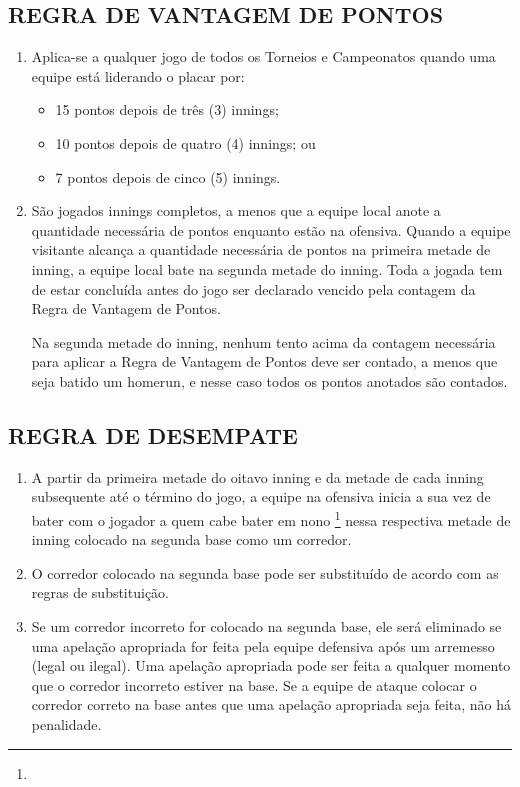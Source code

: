 \subsection{REGRA DE VANTAGEM DE PONTOS}
\begin{enumerate}[label=(\alph*)]
	\item Aplica-se a qualquer jogo de todos os Torneios e Campeonatos quando uma  equipe está liderando o placar por:
	\begin{itemize}
		\item 15 pontos depois de três (3) \glspl{inning};
		\item 10 pontos depois de quatro (4) \glspl{inning}; ou
		\item 7 pontos depois de cinco (5) \glspl{inning}.
	\end{itemize}
	\item São jogados \glspl{inning} completos, a menos que a equipe local anote a  quantidade necessária de pontos enquanto estão na ofensiva. Quando a equipe visitante alcança a quantidade necessária de pontos na primeira metade de \gls{inning}, a equipe local bate na segunda metade do \gls{inning}. Toda a jogada tem de estar concluída antes do jogo ser declarado vencido pela contagem da Regra de Vantagem de Pontos.

	Na segunda metade do \gls{inning}, nenhum tento acima  da contagem necessária para aplicar a Regra de Vantagem de Pontos deve ser contado, a menos que seja batido um \gls{homerun}, e nesse caso todos os pontos anotados são contados.
\end{enumerate}

\subsection{REGRA DE DESEMPATE}
\begin{enumerate}[label=(\alph*)]
	\item A partir da primeira metade do oitavo \gls{inning} e da metade de cada \gls{inning} subsequente até o término do jogo, a equipe na ofensiva inicia a sua vez de bater com o jogador a quem cabe bater em nono \footnote{  } nessa respectiva metade de \gls{inning} colocado na segunda base como um corredor.
	\item  O corredor colocado na segunda base pode ser substituído de acordo com as regras de substituição.
	\item \begin{mdframed}[hidealllines=true,backgroundcolor=blue!20] Se um corredor incorreto for colocado na segunda base, ele será eliminado se uma apelação apropriada for feita pela equipe defensiva após um arremesso (legal ou ilegal). Uma apelação apropriada pode ser feita a  qualquer momento que o corredor incorreto estiver na base. Se a equipe de ataque colocar o corredor correto na base antes que uma apelação apropriada seja feita, não há penalidade.\end{mdframed}
\end{enumerate}


